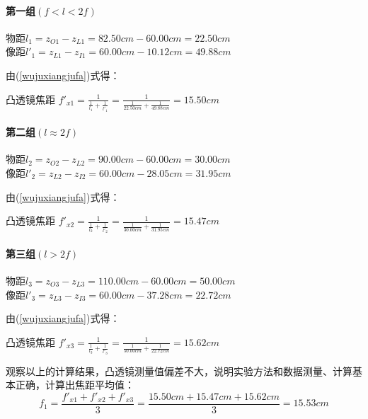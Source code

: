 \documentclass[UTF8]{ctexart}
\begin{document}
\paragraph{第一组$(f<l<2f)$}\quad
\begin{center}
    物距\quad$l_1=z_{O1}-z_{L1}=82.50cm-60.00cm=22.50cm$\\
    像距\quad$l'_1=z_{L1}-z_{I1}=60.00cm-10.12cm=49.88cm$\\
\end{center}
由(\ref{wujuxiangjufa})式得：\par
\begin{center}凸透镜焦距\quad
$\displaystyle{   
     {f'_{x1}}=\frac{1}{\frac{1}{l_1}+\frac{1}{l
    '_1}}=\frac{1}{\frac{1}{22.50cm}+\frac{1}{49.88cm}}=15.50cm
}$
\end{center}

\paragraph{第二组$(l\approx2f)$}\quad
\begin{center}
    物距\quad$l_2=z_{O2}-z_{L2}=90.00cm-60.00cm=30.00cm$\\
    像距\quad$l'_2=z_{L2}-z_{I2}=60.00cm-28.05cm=31.95cm$\\
\end{center}
由(\ref{wujuxiangjufa})式得：\par
\begin{center}凸透镜焦距\quad
$\displaystyle{   
     {f'_{x2}}=\frac{1}{\frac{1}{l_2}+\frac{1}{l'_2}}=\frac{1}{\frac{1}{30.00cm}+\frac{1}{31.95cm}}=15.47cm
}$
\end{center}

\paragraph{第三组$(l>2f)$}\quad
\begin{center}
    物距\quad$l_3=z_{O3}-z_{L3}=110.00cm-60.00cm=50.00cm$\\
    像距\quad$l'_3=z_{L3}-z_{I3}=60.00cm-37.28cm=22.72cm$\\
\end{center}
由(\ref{wujuxiangjufa})式得：\par
\begin{center}凸透镜焦距\quad
$\displaystyle{   
     {f'_{x3}}=\frac{1}{\frac{1}{l_3}+\frac{1}{l'_3}}=\frac{1}{\frac{1}{50.00cm}+\frac{1}{22.72cm}}=15.62cm
}$
\end{center}
观察以上的计算结果，凸透镜测量值偏差不大，说明实验方法和数据测量、计算基本正确，计算出焦距平均值：
\[f_1=\frac{f'_{x1}+f'_{x2}+f'_{x3}}{3}=\frac{15.50cm+15.47cm+15.62cm}{3}=15.53cm\]
\end{document}
